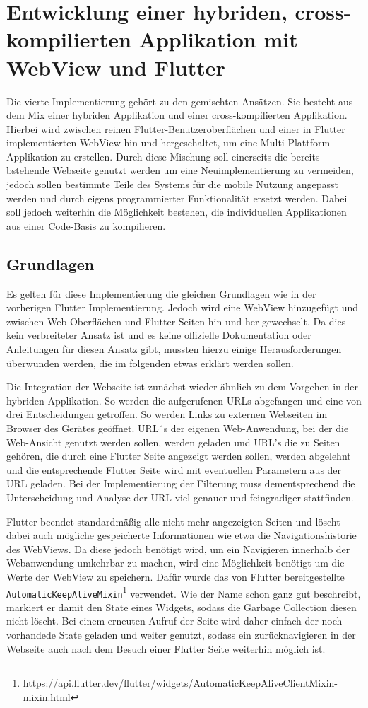 \section{Entwicklung einer hybriden, cross-kompilierten Applikation mit WebView und Flutter}
Die vierte Implementierung gehört zu den gemischten Ansätzen. Sie besteht aus dem Mix einer hybriden Applikation und einer cross-kompilierten Applikation. Hierbei wird zwischen reinen Flutter-Benutzeroberflächen und einer in Flutter implementierten WebView hin und hergeschaltet, um eine Multi-Plattform Applikation zu erstellen. Durch diese Mischung soll einerseits die bereits bstehende Webseite genutzt werden um eine Neuimplementierung zu vermeiden, jedoch sollen bestimmte Teile des Systems für die mobile Nutzung angepasst werden und durch eigens programmierter Funktionalität ersetzt werden. Dabei soll jedoch weiterhin die Möglichkeit bestehen, die individuellen Applikationen aus einer Code-Basis zu kompilieren.

\subsection{Grundlagen}
Es gelten für diese Implementierung die gleichen Grundlagen wie in der vorherigen Flutter Implementierung. Jedoch wird eine WebView hinzugefügt und zwischen Web-Oberflächen und Flutter-Seiten hin und her gewechselt.
Da dies kein verbreiteter Ansatz ist und es keine offizielle Dokumentation oder Anleitungen für diesen Ansatz gibt, mussten hierzu einige Herausforderungen überwunden werden, die im folgenden etwas erklärt werden sollen.

Die Integration der Webseite ist zunächst wieder ähnlich zu dem Vorgehen in der hybriden Applikation. So werden die aufgerufenen URLs abgefangen und eine von drei Entscheidungen getroffen. So werden Links zu externen Webseiten im Browser des Gerätes geöffnet. URL´s der eigenen Web-Anwendung, bei der die Web-Ansicht genutzt werden sollen, werden geladen und URL's die zu Seiten gehören, die durch eine Flutter Seite angezeigt werden sollen, werden abgelehnt und die entsprechende Flutter Seite wird mit eventuellen Parametern aus der URL geladen. Bei der Implementierung der Filterung muss dementsprechend die Unterscheidung und Analyse der URL viel genauer und feingradiger stattfinden.

Flutter beendet standardmäßig alle nicht mehr angezeigten Seiten und löscht dabei auch mögliche gespeicherte Informationen wie etwa die Navigationshistorie des WebViews. Da diese jedoch benötigt wird, um ein Navigieren innerhalb der Webanwendung umkehrbar zu machen, wird eine Möglichkeit benötigt um die Werte der WebView zu speichern. Dafür wurde das von Flutter bereitgestellte \verb|AutomaticKeepAliveMixin|\footnote{https://api.flutter.dev/flutter/widgets/AutomaticKeepAliveClientMixin-mixin.html} verwendet. 
Wie der Name schon ganz gut beschreibt, markiert er damit den State eines Widgets, sodass die Garbage Collection diesen nicht  löscht. Bei einem erneuten Aufruf der Seite wird daher einfach der noch vorhandede State geladen und weiter genutzt, sodass ein zurücknavigieren in der Webseite auch nach dem Besuch einer Flutter Seite weiterhin möglich ist.

